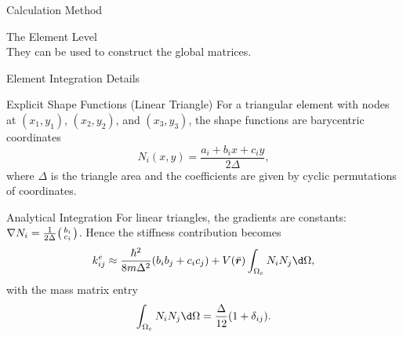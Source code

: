 \documentclass[svgnames, aspectratio = 1610]{beamer}
\begin{document}
\begin{frame}{Calculation Method}
{{\begin{exampleblock}{The Element Level}
\begin{equation}
    \end{equation}
    They can be used to construct the global matrices.
  \end{exampleblock}
  }}
\end{frame}

\begin{frame}{Element Integration Details}
  \begin{block}{Explicit Shape Functions (Linear Triangle)}
    For a triangular element with nodes at $(x_1,y_1)$, $(x_2,y_2)$,
    and $(x_3,y_3)$, the shape functions are barycentric coordinates
    \[
      N_i(x,y) = \frac{a_i + b_i x + c_i y}{2\Delta},
    \]
    where $\Delta$ is the triangle area and the coefficients are given by
    cyclic permutations of coordinates.
  \end{block}
  \pause
  \begin{exampleblock}{Analytical Integration}
    For linear triangles, the gradients are constants: $\nabla N_i
    = \frac{1}{2\Delta} \begin{psmallmatrix} b_i \\ c_i \end{psmallmatrix}$.
    Hence the stiffness contribution becomes
    \[
      k^e_{ij} \approx \frac{\hbar^2}{8m\Delta^2} (b_i b_j + c_i c_j)
               + V(\bar{\bm r}) \int_{\Omega_e} N_i N_j \d \Omega,
    \]
    with the mass matrix entry
    \[
      \int_{\Omega_e} N_i N_j \d \Omega = \frac{\Delta}{12} (1 + \delta_{ij}).
    \]
  \end{exampleblock}
\end{frame}
\end{document}
